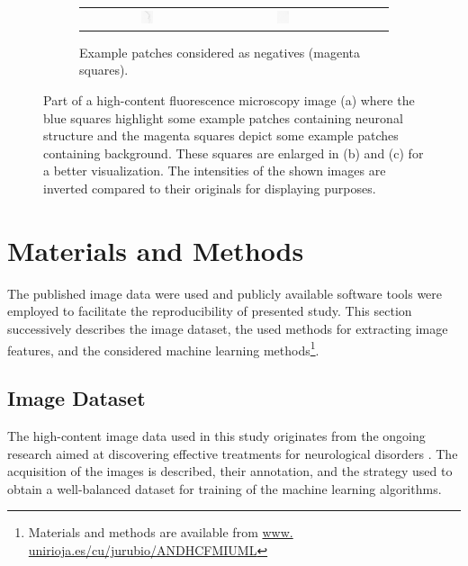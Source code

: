 \begin{figure}
\begin{subfigure}{\textwidth}
\begin{tabular}{c@{\,}c@{\,}c@{\,}c@{\,}c@{}}
			\includegraphics[width=0.1\textwidth]{fig01c14} &
			\includegraphics[width=0.1\textwidth]{fig01c15}
		\end{tabular}
		\vspace{-0.5em}
		\caption{Example patches considered as negatives (magenta squares).}
	\end{subfigure}	
	\caption{Part of a high-content fluorescence microscopy image (a) where the blue squares highlight some example patches containing neuronal structure and the magenta squares depict some example patches containing background. These squares are enlarged in (b) and (c) for a better visualization. The intensities of the shown images are inverted compared to their originals for displaying purposes.}
	\label{ch5_fig1}
\end{figure}
\section{Materials and Methods}
\label{sec:matmet}
The published image data were used and publicly available software tools were employed to facilitate the reproducibility of presented study. This section successively describes the image dataset, the used methods for extracting image features, and the considered machine learning methods\footnote{Materials and methods are available from \url{www. unirioja.es/cu/jurubio/ANDHCFMIUML}}.

\subsection{Image Dataset}
\label{sec:data}

The high-content image data used in this study originates from the ongoing research aimed at discovering effective treatments for neurological disorders \cite{cuesto2011phosphoinositide, enriquez2014learning, enriquez2016pi3k}. The acquisition of the images is described, their annotation, and the strategy used to obtain a well-balanced dataset for training of the machine learning algorithms.

